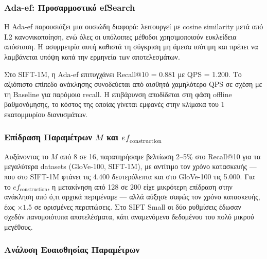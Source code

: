 \documentclass[12pt,a4paper]{article}
\begin{document}
\subsubsection{Ada-ef: Προσαρμοστικό efSearch}
Η Ada-ef παρουσιάζει μια ουσιώδη διαφορά: λειτουργεί με cosine similarity μετά από L2 κανονικοποίηση, ενώ όλες οι υπόλοιπες μέθοδοι χρησιμοποιούν ευκλείδεια απόσταση. Η ασυμμετρία αυτή καθιστά τη σύγκριση μη άμεσα ισότιμη και πρέπει να λαμβάνεται υπόψη κατά την ερμηνεία των αποτελεσμάτων.

Στο SIFT-1M, η Ada-ef επιτυγχάνει Recall@10 = 0.881 με QPS = 1.200. Το αξιόπιστο επίπεδο ανάκλησης συνοδεύεται από αισθητά χαμηλότερο QPS σε σχέση με τη Baseline για παρόμοιο recall. Η επιβάρυνση αποδίδεται στη φάση offline βαθμονόμησης, το κόστος της οποίας γίνεται εμφανές στην κλίμακα του 1 εκατομμυρίου διανυσμάτων.

\subsubsection{Επίδραση Παραμέτρων $M$ και $ef_{\text{construction}}$}
Αυξάνοντας το $M$ από 8 σε 16, παρατηρήσαμε βελτίωση 2--5\% στο Recall@10 για τα μεγαλύτερα datasets (GloVe-100, SIFT-1M), με αντίτιμο τον χρόνο κατασκευής --- που στο SIFT-1M φτάνει τις 4.400 δευτερόλεπτα και στο GloVe-100 τις 5.000. Για το $ef_{\text{construction}}$, η μετακίνηση από 128 σε 200 είχε μικρότερη επίδραση στην ανάκληση από ό,τι αρχικά περιμέναμε --- αλλά αύξησε σαφώς τον χρόνο κατασκευής, έως $\times 1.5$ σε ορισμένες περιπτώσεις. Στο SIFT Small οι δύο ρυθμίσεις έδωσαν σχεδόν πανομοιότυπα αποτελέσματα, κάτι αναμενόμενο δεδομένου του πολύ μικρού μεγέθους.

\subsubsection{Ανάλυση Ευαισθησίας Παραμέτρων}
\end{document}
